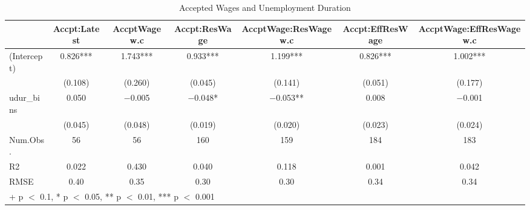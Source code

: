 \documentclass[
]{article}
\begin{document}
\begin{table}
\centering
\caption{\label{tab:unnamed-chunk-10}Accepted Wages and Unemployment Duration}
\centering
\begin{tabular}[t]{lcccccc}
\toprule
  & Accpt:Latest & AccptWage w.c & Accpt:ResWage & AccptWage:ResWage w.c & Accpt:EffResWage & AccptWage:EffResWage w.c\\
\midrule
(Intercept) & \num{0.826}*** & \num{1.743}*** & \num{0.933}*** & \num{1.199}*** & \num{0.826}*** & \num{1.002}***\\
 & (\num{0.108}) & (\num{0.260}) & (\num{0.045}) & (\num{0.141}) & (\num{0.051}) & (\num{0.177})\\
udur\_bins & \num{0.050} & \num{-0.005} & \num{-0.048}* & \num{-0.053}** & \num{0.008} & \num{-0.001}\\
 & (\num{0.045}) & (\num{0.048}) & (\num{0.019}) & (\num{0.020}) & (\num{0.023}) & (\num{0.024})\\
\midrule
Num.Obs. & \num{56} & \num{56} & \num{160} & \num{159} & \num{184} & \num{183}\\
R2 & \num{0.022} & \num{0.430} & \num{0.040} & \num{0.118} & \num{0.001} & \num{0.042}\\
RMSE & \num{0.40} & \num{0.35} & \num{0.30} & \num{0.30} & \num{0.34} & \num{0.34}\\
\bottomrule
\multicolumn{7}{l}{\rule{0pt}{1em}+ p $<$ 0.1, * p $<$ 0.05, ** p $<$ 0.01, *** p $<$ 0.001}\\
\end{tabular}
\end{table}
\end{document}
